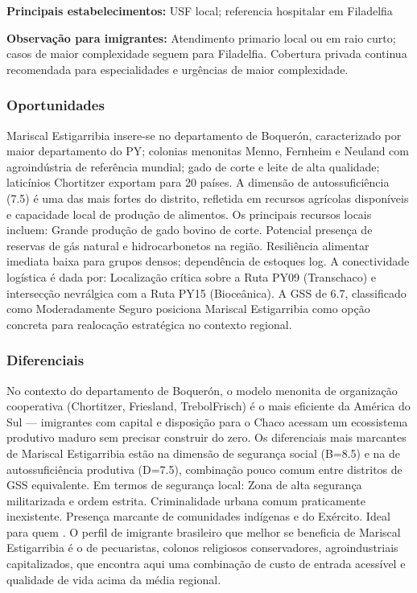 \textbf{Principais estabelecimentos:} USF local; referencia hospitalar
em Filadelfia

\textbf{Observação para imigrantes:} Atendimento primario local ou em
raio curto; casos de maior complexidade seguem para Filadelfia.
Cobertura privada continua recomendada para especialidades e urgências
de maior complexidade.

\subsubsection*{Oportunidades}\label{oport-mariscal-estigarribia-1602}
Mariscal Estigarribia insere-se no departamento de Boquerón, caracterizado por maior departamento do PY; colonias menonitas Menno, Fernheim e Neuland com agroindústria de referência mundial; gado de corte e leite de alta qualidade; laticínios Chortitzer exportam para 20 países. A dimensão de autossuficiência (7.5) é uma das mais fortes do distrito, refletida em recursos agrícolas disponíveis e capacidade local de produção de alimentos. Os principais recursos locais incluem: Grande produção de gado bovino de corte. Potencial presença de reservas de gás natural e hidrocarbonetos na região. Resiliência alimentar imediata baixa para grupos densos; dependência de estoques log. A conectividade logística é dada por: Localização crítica sobre a Ruta PY09 (Transchaco) e intersecção nevrálgica com a Ruta PY15 (Bioceânica). A GSS de 6.7, classificado como Moderadamente Seguro posiciona Mariscal Estigarribia como opção concreta para realocação estratégica no contexto regional.

\subsubsection*{Diferenciais}\label{dif-mariscal-estigarribia-1602}
No contexto do departamento de Boquerón, o modelo menonita de organização cooperativa (Chortitzer, Friesland, TrebolFrisch) é o mais eficiente da América do Sul — imigrantes com capital e disposição para o Chaco acessam um ecossistema produtivo maduro sem precisar construir do zero. Os diferenciais mais marcantes de Mariscal Estigarribia estão na dimensão de segurança social (B=8.5) e na de autossuficiência produtiva (D=7.5), combinação pouco comum entre distritos de GSS equivalente. Em termos de segurança local: Zona de alta segurança militarizada e ordem estrita. Criminalidade urbana comum praticamente inexistente. Presença marcante de comunidades indígenas e do Exército. Ideal para quem . O perfil de imigrante brasileiro que melhor se beneficia de Mariscal Estigarribia é o de pecuaristas, colonos religiosos conservadores, agroindustriais capitalizados, que encontra aqui uma combinação de custo de entrada acessível e qualidade de vida acima da média regional.
